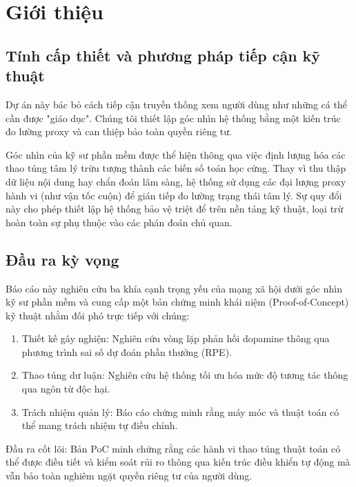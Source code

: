 \section{Giới thiệu}

\subsection{Tính cấp thiết và phương pháp tiếp cận kỹ thuật}

Dự án này bác bỏ cách tiếp cận truyền thống xem người dùng như những cá thể cần được "giáo dục". Chúng tôi thiết lập góc nhìn hệ thống bằng một kiến trúc đo lường proxy và can thiệp bảo toàn quyền riêng tư.

Góc nhìn của kỹ sư phần mềm được thể hiện thông qua việc định lượng hóa các thao túng tâm lý trừu tượng thành các biến số toán học cứng. Thay vì thu thập dữ liệu nội dung hay chẩn đoán lâm sàng, hệ thống sử dụng các đại lượng proxy hành vi (như vận tốc cuộn) để gián tiếp đo lường trạng thái tâm lý. Sự quy đổi này cho phép thiết lập hệ thống bảo vệ triệt để trên nền tảng kỹ thuật, loại trừ hoàn toàn sự phụ thuộc vào các phán đoán chủ quan.

\subsection{Đầu ra kỳ vọng}

Báo cáo này nghiên cứu ba khía cạnh trọng yếu của mạng xã hội dưới góc nhìn kỹ sư phần mềm và cung cấp một bản chứng minh khái niệm (Proof-of-Concept) kỹ thuật nhằm đối phó trực tiếp với chúng:

\begin{enumerate}
    \item Thiết kế gây nghiện: Nghiên cứu vòng lặp phản hồi dopamine thông qua phương trình sai số dự đoán phần thưởng (RPE).
    
    \item Thao túng dư luận: Nghiên cứu hệ thống tối ưu hóa mức độ tương tác thông qua ngôn từ độc hại.
    
    \item Trách nhiệm quản lý: Báo cáo chứng minh rằng máy móc và thuật toán có thể mang trách nhiệm tự điều chỉnh.
\end{enumerate}

Đầu ra cốt lõi: Bản PoC minh chứng rằng các hành vi thao túng thuật toán có thể được điều tiết và kiểm soát rủi ro thông qua kiến trúc điều khiển tự động mà vẫn bảo toàn nghiêm ngặt quyền riêng tư của người dùng.

